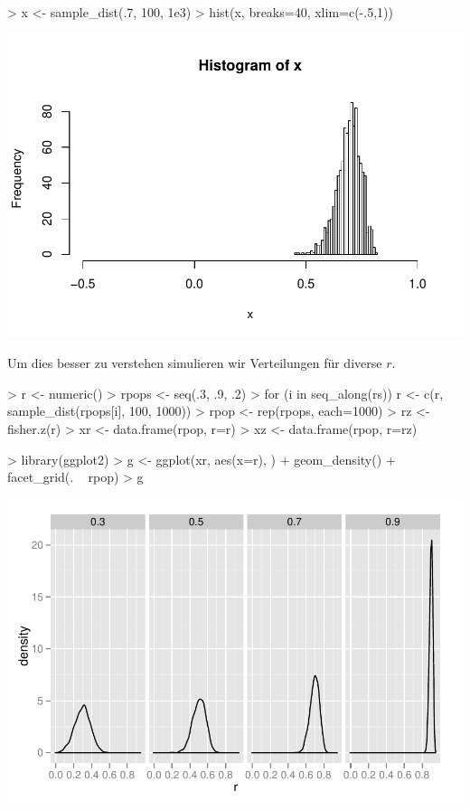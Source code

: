 \begin{Schunk}
\begin{Sinput}
> x <- sample_dist(.7, 100, 1e3)
> hist(x, breaks=40, xlim=c(-.5,1))  
\end{Sinput}
\end{Schunk}
\includegraphics{sim_correlation-006}

Um dies besser zu verstehen simulieren wir Verteilungen für diverse $r$.
\begin{Schunk}
\begin{Sinput}
> r <- numeric()
> rpops <- seq(.3, .9, .2)
> for (i in seq_along(rs))
   r <- c(r, sample_dist(rpops[i], 100, 1000))
> rpop <- rep(rpops, each=1000)
> rz <- fisher.z(r)
> xr <- data.frame(rpop, r=r) 
> xz <- data.frame(rpop, r=rz) 
\end{Sinput}
\end{Schunk}

\begin{Schunk}
\begin{Sinput}
> library(ggplot2)
> g <- ggplot(xr, aes(x=r), ) +  geom_density() + 
             facet_grid(. ~ rpop)
> g
\end{Sinput}
\end{Schunk}
\includegraphics{sim_correlation-008}

